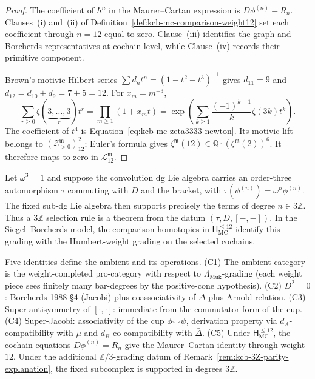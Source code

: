 \begin{proof}
The coefficient of \(\hbar^n\) in the Maurer--Cartan expression is
\(D\phi^{(n)}-R_n\).  Clauses~\textup{(i)} and~\textup{(ii)} of
Definition~\ref{def:kcb-mc-comparison-weight12} set each coefficient
through \(n=12\) equal to zero.  Clause~\textup{(iii)} identifies the
graph and Borcherds representatives at cochain level, while
Clause~\textup{(iv)} records their primitive component.

Brown's motivic Hilbert series
\(\sum d_nt^n=(1-t^2-t^3)^{-1}\) gives
\(d_{11}=9\) and \(d_{12}=d_{10}+d_9=7+5=12\).
For \(x_m=m^{-3}\),
\[
 \sum_{r\geq0}\zeta(\underbrace{3,\ldots,3}_{r})t^r
 =\prod_{m\geq1}(1+x_mt)
 =\exp\!\left(\sum_{k\geq1}
 \frac{(-1)^{k-1}}{k}\zeta(3k)t^k\right).
\]
The coefficient of \(t^4\) is
Equation~\eqref{eq:kcb-mc-zeta3333-newton}.  Its motivic lift belongs
to \((\mathcal Z^{\mathfrak m}_{>0})^2_{12}\); Euler's formula gives
$\zeta^{\mathfrak m}(12)\in
\mathbb Q\cdot(\zeta^{\mathfrak m}(2))^6$.  It therefore maps to
zero in \(\mathcal L^{\mathfrak m}_{12}\).
\end{proof}

\begin{remark}
\label{rem:kcb-3Z-parity-explanation}
Let $\omega^3=1$ and suppose the convolution dg Lie algebra carries an
order-three automorphism $\tau$ commuting with $D$ and the bracket,
with $\tau(\phi^{(n)})=\omega^n\phi^{(n)}$.  The fixed sub-dg Lie
algebra then supports precisely the terms of degree
$n\in3\mathbb Z$.  Thus a $3\mathbb Z$ selection rule is a theorem
from the datum $(\tau,D,[-,-])$.  In the Siegel--Borcherds model, the
comparison homotopies in
$\mathsf H_{\mathrm{MC}}^{\leq12}$ identify this grading with the
Humbert-weight grading on the selected cochains.
\end{remark}

\begin{remark}
\label{rem:kcb-convolution-dgla-checks}
Five identities define the ambient and its operations.
\textup{(C1)} The ambient category is the weight-completed
pro-category with respect to
$\Lambda_{\mathrm{Muk}}$-grading (each weight piece sees finitely
many bar-degrees by the positive-cone hypothesis).
\textup{(C2)} $D^2 = 0$: Borcherds 1988 \S 4 (Jacobi) plus
coassociativity of $\bar\Delta$ plus Arnold relation.
\textup{(C3)} Super-antisymmetry of $[\cdot,\cdot]$: immediate from
the commutator form of the cup.
\textup{(C4)} Super-Jacobi: associativity of the cup
$\phi\smile\psi$, derivation property via $d_A$-compatibility with $\mu$
and $d_B$-co-compatibility with $\bar\Delta$.
\textup{(C5)} Under
$\mathsf H_{\mathrm{MC}}^{\leq12}$, the cochain equations
$D\phi^{(n)}=R_n$ give the Maurer--Cartan identity through weight
$12$.  Under the additional $\mathbb Z/3$-grading datum of
Remark~\ref{rem:kcb-3Z-parity-explanation}, the fixed subcomplex is
supported in degrees $3\mathbb Z$.
\end{remark}

